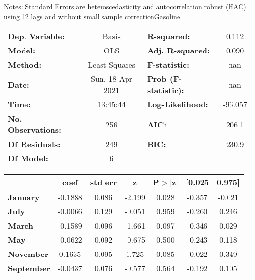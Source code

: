Notes: \newline
 [1] Standard Errors are heteroscedasticity and autocorrelation robust (HAC) using 12 lags and without small sample correctionGasoline\begin{center}
\begin{tabular}{lclc}
\toprule
\textbf{Dep. Variable:}    &      Basis       & \textbf{  R-squared:         } &     0.112   \\
\textbf{Model:}            &       OLS        & \textbf{  Adj. R-squared:    } &     0.090   \\
\textbf{Method:}           &  Least Squares   & \textbf{  F-statistic:       } &       nan   \\
\textbf{Date:}             & Sun, 18 Apr 2021 & \textbf{  Prob (F-statistic):} &      nan    \\
\textbf{Time:}             &     13:45:44     & \textbf{  Log-Likelihood:    } &   -96.057   \\
\textbf{No. Observations:} &         256      & \textbf{  AIC:               } &     206.1   \\
\textbf{Df Residuals:}     &         249      & \textbf{  BIC:               } &     230.9   \\
\textbf{Df Model:}         &           6      & \textbf{                     } &             \\
\bottomrule
\end{tabular}
\begin{tabular}{lcccccc}
                   & \textbf{coef} & \textbf{std err} & \textbf{z} & \textbf{P$> |$z$|$} & \textbf{[0.025} & \textbf{0.975]}  \\
\midrule
\textbf{January}   &      -0.1888  &        0.086     &    -2.199  &         0.028        &       -0.357    &       -0.021     \\
\textbf{July}      &      -0.0066  &        0.129     &    -0.051  &         0.959        &       -0.260    &        0.246     \\
\textbf{March}     &      -0.1589  &        0.096     &    -1.661  &         0.097        &       -0.346    &        0.029     \\
\textbf{May}       &      -0.0622  &        0.092     &    -0.675  &         0.500        &       -0.243    &        0.118     \\
\textbf{November}  &       0.1635  &        0.095     &     1.725  &         0.085        &       -0.022    &        0.349     \\
\textbf{September} &      -0.0437  &        0.076     &    -0.577  &         0.564        &       -0.192    &        0.105     \\

\end{tabular}
\end{center}
